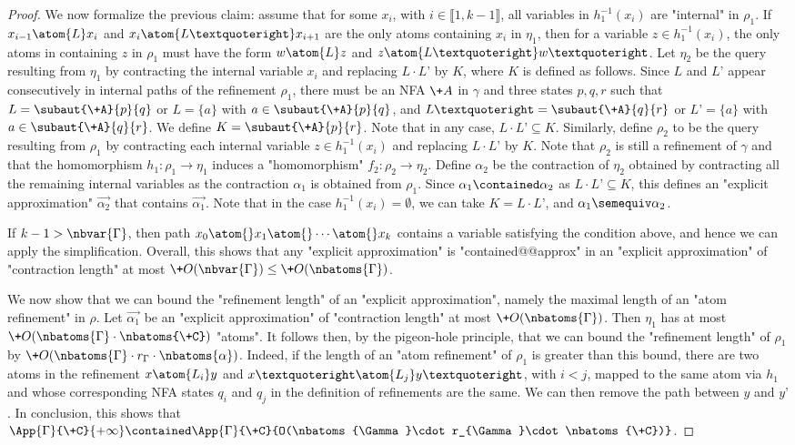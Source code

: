 \begin{proof}
	We now formalize the previous claim: assume that for some $x_i$, with $i\in \lBrack 1,k-1\rBrack$, all variables in $h_1^{-1}(x_i)$ are "internal" in $\rho_1$. If $x_{i-1}\atom{L} x_i$ and $x_i\atom{L’} x_{i+1}$ are the only atoms containing $x_i$ in $\eta_1$, then for a variable $z\in h_1^{-1}(x_i)$, the only atoms in  containing $z$ in $\rho_1$ must have the form $w\atom{L} z$ and $z\atom{L’} w’$. Let $\eta_2$ be the query resulting from $\eta_1$ by contracting the internal variable $x_i$ and replacing $L\cdot L’$ by $K$, where $K$ is defined as follows. Since $L$ and $L’$ appear consecutively in internal paths of the refinement $\rho_1$, there must be an  NFA $\+A$ in $\gamma$ and three states $p,q,r$ such that $L=\subaut{\+A}{p}{q}$ or $L=\{a\}$ with $a\in \subaut{\+A}{p}{q}$, and   $L’=\subaut{\+A}{q}{r}$ or $L’=\{a\}$ with $a\in \subaut{\+A}{q}{r}$. We define $K=\subaut{\+A}{p}{r}$. Note that in any case, $L\cdot L’\subseteq K$. Similarly, define $\rho_2$ to be the query resulting from $\rho_1$ by contracting each internal variable $z\in h_1^{-1}(x_i)$ and replacing $L\cdot L’$ by $K$. Note that $\rho_2$ is still a refinement of $\gamma$ and that the homomorphism  $h_1\colon \rho_1 \to \eta_1$ induces a "homomorphism" $f_2\colon \rho_2 \to \eta_2$. Define $\alpha_2$ be the contraction of $\eta_2$ obtained by contracting all the remaining internal variables as  the contraction $\alpha_1$ is obtained from  $\rho_1$. Since $\alpha_1\contained \alpha_2$ as $L\cdot L’\subseteq K$, this defines an  "explicit approximation" $\vec{\alpha_2}$ that contains $\vec{\alpha_1}$. Note that in the case $h_1^{-1}(x_i)=\emptyset$, we can take $K=L\cdot L’$, and $\alpha_1\semequiv \alpha_2$.

	If $k-1>\nbvar{\Gamma}$, then path $x_0 \atom{} x_1 \atom{} \cdots \atom{} x_k$ contains a variable satisfying the condition above, and hence we can apply the simplification. Overall, this shows that any "explicit approximation" is "contained@@approx"
	in an "explicit approximation" of "contraction length" at most
	$\+O(\nbvar{\Gamma})\leq \+O(\nbatoms{\Gamma})$.

	We now show that we can bound the "refinement length" of an "explicit approximation",
	namely the maximal length of an "atom refinement" in $\rho$.
	Let $\vec{\alpha_1}$ be an "explicit approximation" of "contraction length" at most
	$\+O(\nbatoms{\Gamma})$. Then $\eta_1$ has at most $\+O(\nbatoms{\Gamma}\cdot\nbatoms{\+C})$
	"atoms". It follows then, by the pigeon-hole principle, that we can bound the
	"refinement length" of $\rho_1$ by $\+O(\nbatoms{\Gamma}\cdot r_{\Gamma}\cdot\nbatoms{\alpha})$. Indeed, if the length of an "atom refinement" of $\rho_1$  is greater than this bound, there are two  atoms in the refinement $x\atom{L_i} y$ and  $x’\atom{L_j} y’$, with $i<j$, mapped to the same atom via $h_1$ and whose corresponding NFA states $q_i$ and $q_j$ in the definition of refinements are the same. We can then remove the path between $y$ and $y’$.
	In conclusion, this shows that $\App{\Gamma}{\+C}{+\infty} \contained \App{\Gamma}{\+C}{O(\nbatoms{\Gamma}\cdot r_{\Gamma}\cdot \nbatoms{\+C})}$.


\end{proof}
